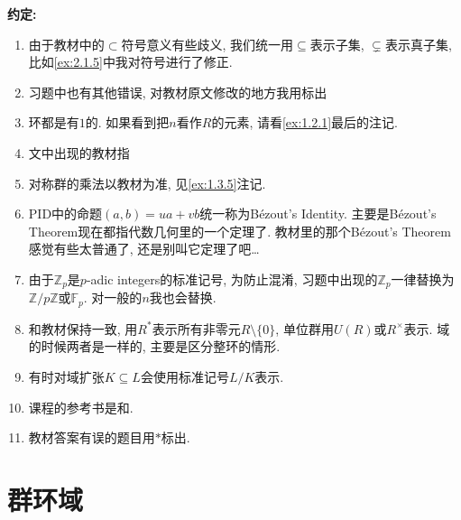 \textbf{约定:}
\begin{enumerate}
    \item 由于教材中的$\subset$符号意义有些歧义, 我们统一用$\subseteq$表示子集, $\subsetneq$表示真子集, 比如\ref{ex:2.1.5}中我对符号进行了修正.
    \item 习题中也有其他错误, 对教材原文修改的地方我用标出
    \item 环都是有$1$的. 如果看到把$n$看作$R$的元素, 请看\ref{ex:1.2.1}最后的注记.
    \item 文中出现的教材指\cite{2022抽象代数}
    \item 对称群的乘法以教材为准, 见\ref{ex:1.3.5}注记.
    \item PID中的命题$(a, b) = ua + vb$统一称为Bézout's Identity. 主要是Bézout's Theorem现在都指代数几何里的一个定理了. 教材里的那个Bézout's Theorem感觉有些太普通了, 还是别叫它定理了吧\dots
    \item 由于$\mathbb{Z}_p$是$p$-adic integers的标准记号, 为防止混淆, 习题中出现的$\mathbb{Z}_p$一律替换为$\mathbb{Z}/p\mathbb{Z}$或$\mathbb{F}_p$. 对一般的$n$我也会替换.
    \item 和教材保持一致, 用$R^*$表示所有非零元$R \setminus \{0\}$, 单位群用$U(R)$或$R^\times$表示. 域的时候两者是一样的, 主要是区分整环的情形.
    \item 有时对域扩张$K \subseteq L$会使用标准记号$L/K$表示.
    \item 课程的参考书是\cite{lang2012algebra}和\cite{2009近世代数引论}.
    \item 教材答案有误的题目用$*$标出.
\end{enumerate}

\section{群环域}



